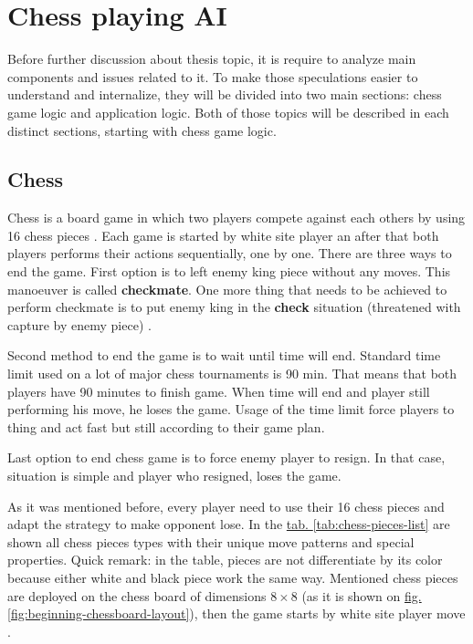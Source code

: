 
\chapter{Chess playing AI}
Before further discussion about thesis topic, it is require to analyze main components and issues related to it. To make those speculations easier to understand and internalize, they will be divided into two main sections: chess game logic and application logic. Both of those topics will be described in each distinct sections, starting with chess game logic.
    \section{Chess}
    Chess is a board game in which two players compete against each others by using 16 chess pieces \cite{bib:book-chess-bible}. Each game is started by white site player an after that both players performs their actions sequentially, one by one. There are three ways to end the game. First option is to left enemy king piece without any moves. This manoeuver is called \textbf{checkmate}. One more thing that needs to be achieved to perform checkmate is to put enemy king in the \textbf{check} situation (threatened with capture by enemy piece) \cite{bib:book-chess-bible,bib:internet-learn-how-to-play-chess}. 

    Second method to end the game is to wait until time will end. Standard time limit used on a lot of major chess tournaments is 90 min. That means that both players have 90 minutes to finish game. When time will end and player still performing his move, he loses the game. Usage of the time limit force players to thing and act fast but still according to their game plan.

    Last option to end chess game is to force enemy player to resign. In that case, situation is simple and player who resigned, loses the game. 
    
    As it was mentioned before, every player need to use their 16 chess pieces and adapt the strategy to make opponent lose. In the \hyperref[tab:chess-pieces-list]{tab. \ref*{tab:chess-pieces-list}} are shown all chess pieces types with their unique move patterns and special properties. Quick remark: in the table, pieces are not differentiate by its color because either white and black piece work the same way. Mentioned chess pieces are deployed on the chess board of dimensions $8 \times 8$ (as it is shown on \hyperref[fig:beginning-chessboard-layout]{fig. \ref*{fig:beginning-chessboard-layout}}), then the game starts by white site player move \cite{bib:book-chess-bible,bib:book-bobby-fisher-teaches-chess,bib:book-mastering-chess-logic}.

